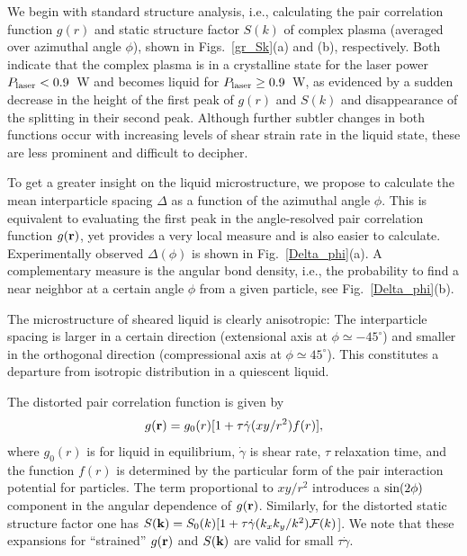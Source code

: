 \documentclass[aps,prl,twocolumn,showpacs,groupedaddress,amssymb]{revtex4}
\begin{document}
We begin with standard structure analysis, i.e., calculating the pair correlation function $g(r)$ and static structure factor $S(k)$ of complex plasma (averaged over azimuthal angle $\phi$), shown in Figs.~\ref{gr_Sk}(a) and (b), respectively. Both indicate that the complex plasma is in a crystalline state for the laser power $P_{\rm laser}<0.9$~W and becomes liquid for $P_{\rm laser}\geq0.9$~W, as evidenced by a sudden decrease in the height of the first peak of $g(r)$ and $S(k)$ and disappearance of the splitting in their second peak. Although further subtler changes in both functions occur with increasing levels of shear strain rate in the liquid state, these are less prominent and difficult to decipher.

To get a greater insight on the liquid microstructure, we propose to calculate the mean interparticle spacing $\Delta$ as a function of the azimuthal angle $\phi$. This is equivalent to evaluating the first peak in the angle-resolved pair correlation function $g({\bf r})$, yet provides a very local measure and is also easier to calculate. Experimentally observed $\Delta(\phi)$ is shown in Fig.~\ref{Delta_phi}(a). A complementary measure is the angular bond density, i.e., the probability to find a near neighbor at a certain angle $\phi$ from a given particle, see Fig.~\ref{Delta_phi}(b).

The microstructure of sheared liquid is clearly anisotropic: The interparticle spacing is larger in a certain direction (extensional axis at $\phi\simeq -45^{\circ}$) and smaller in the orthogonal direction (compressional axis at $\phi\simeq 45^{\circ}$). This constitutes a departure from isotropic distribution in a quiescent liquid.

The distorted pair correlation function is given by
\begin{equation}\label{gr}
g({\bf r})=g_0(r)[1+\tau\dot{\gamma}(xy/r^2)f(r)],
\end{equation}
where $g_0(r)$ is for liquid in equilibrium, $\dot{\gamma}$ is shear rate, $\tau$ relaxation time, and the function $f(r)$ is determined by the particular form of the pair interaction potential for particles. The term proportional to $xy/r^2$ introduces a ${\rm sin}(2\phi)$ component in the angular dependence of $g({\bf r})$. Similarly, for the distorted static structure factor one has $S({\bf k})=S_0(k)[1+\tau\dot{\gamma}(k_xk_y/k^2)\mathcal{F}(k)$]. We note that these expansions for ``strained'' $g({\bf r})$ and $S({\bf k})$ are valid for small $\tau\dot{\gamma}$.
\end{document}

